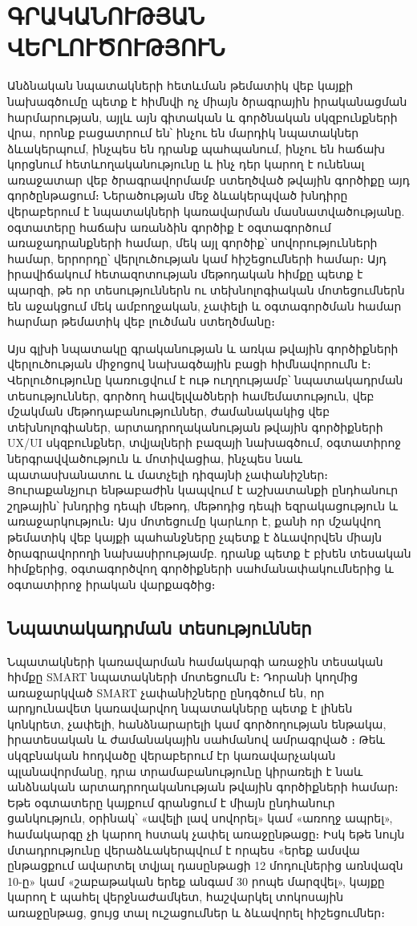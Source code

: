 \chapter{ԳՐԱԿԱՆՈՒԹՅԱՆ ՎԵՐԼՈՒԾՈՒԹՅՈՒՆ}
\sloppy

Անձնական նպատակների հետևման թեմատիկ վեբ կայքի նախագծումը պետք է հիմնվի ոչ միայն ծրագրային իրականացման հարմարության, այլև այն գիտական և գործնական սկզբունքների վրա, որոնք բացատրում են՝ ինչու են մարդիկ նպատակներ ձևակերպում, ինչպես են դրանք պահպանում, ինչու են հաճախ կորցնում հետևողականությունը և ինչ դեր կարող է ունենալ առաջատար վեբ ծրագրավորմամբ ստեղծված թվային գործիքը այդ գործընթացում։ Ներածության մեջ ձևակերպված խնդիրը վերաբերում է նպատակների կառավարման մասնատվածությանը. օգտատերը հաճախ առանձին գործիք է օգտագործում առաջադրանքների համար, մեկ այլ գործիք՝ սովորությունների համար, երրորդը՝ վերլուծության կամ հիշեցումների համար։ Այդ իրավիճակում հետազոտության մեթոդական հիմքը պետք է պարզի, թե որ տեսություններն ու տեխնոլոգիական մոտեցումներն են աջակցում մեկ ամբողջական, չափելի և օգտագործման համար հարմար թեմատիկ վեբ լուծման ստեղծմանը։

Այս գլխի նպատակը գրականության և առկա թվային գործիքների վերլուծության միջոցով նախագծային բացի հիմնավորումն է։ Վերլուծությունը կառուցվում է ութ ուղղությամբ՝ նպատակադրման տեսություններ, գործող հավելվածների համեմատություն, վեբ մշակման մեթոդաբանություններ, ժամանակակից վեբ տեխնոլոգիաներ, արտադրողականության թվային գործիքների UX/UI սկզբունքներ, տվյալների բազայի նախագծում, օգտատիրոջ ներգրավվածություն և մոտիվացիա, ինչպես նաև պատասխանատու և մատչելի դիզայնի չափանիշներ։ Յուրաքանչյուր ենթաբաժին կապվում է աշխատանքի ընդհանուր շղթային՝ խնդրից դեպի մեթոդ, մեթոդից դեպի եզրակացություն և առաջարկություն։ Այս մոտեցումը կարևոր է, քանի որ մշակվող թեմատիկ վեբ կայքի պահանջները չպետք է ձևավորվեն միայն ծրագրավորողի նախասիրությամբ. դրանք պետք է բխեն տեսական հիմքերից, օգտագործվող գործիքների սահմանափակումներից և օգտատիրոջ իրական վարքագծից։

\section{Նպատակադրման տեսություններ}

Նպատակների կառավարման համակարգի առաջին տեսական հիմքը SMART նպատակների մոտեցումն է։ Դորանի կողմից առաջարկված SMART չափանիշները ընդգծում են, որ արդյունավետ կառավարվող նպատակները պետք է լինեն կոնկրետ, չափելի, հանձնարարելի կամ գործողության ենթակա, իրատեսական և ժամանակային սահմանով ամրագրված \autocite{doran1981smart}։ Թեև սկզբնական հոդվածը վերաբերում էր կառավարչական պլանավորմանը, դրա տրամաբանությունը կիրառելի է նաև անձնական արտադրողականության թվային գործիքների համար։ Եթե օգտատերը կայքում գրանցում է միայն ընդհանուր ցանկություն, օրինակ՝ «ավելի լավ սովորել» կամ «առողջ ապրել», համակարգը չի կարող հստակ չափել առաջընթացը։ Իսկ եթե նույն մտադրությունը վերաձևակերպվում է որպես «երեք ամսվա ընթացքում ավարտել տվյալ դասընթացի 12 մոդուլներից առնվազն 10-ը» կամ «շաբաթական երեք անգամ 30 րոպե մարզվել», կայքը կարող է պահել վերջնաժամկետ, հաշվարկել տոկոսային առաջընթաց, ցույց տալ ուշացումներ և ձևավորել հիշեցումներ։

